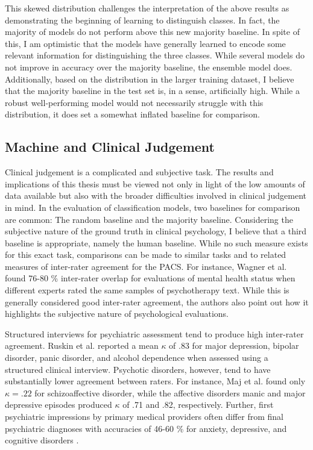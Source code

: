 \documentclass[12pt]{report}
\begin{document}
This skewed distribution challenges the interpretation of the above results as demonstrating the beginning of learning to distinguish classes.
In fact, the majority of models do not perform above this new majority baseline.
In spite of this, I am optimistic that the models have generally learned to encode some relevant information for distinguishing the three classes.
While several models do not improve in accuracy over the majority baseline, the ensemble model does.
Additionally, based on the distribution in the larger training dataset, I believe that the majority baseline in the test set is, in a sense, artificially high.
While a robust well-performing model would not necessarily struggle with this distribution, it does set a somewhat inflated baseline for comparison.

\subsection{Machine and Clinical Judgement}
Clinical judgement is a complicated and subjective task.
The results and implications of this thesis must be viewed not only in light of the low amounts of data available but also with the broader difficulties involved in clinical judgement in mind.
In the evaluation of classification models, two baselines for comparison are common: The random baseline and the majority baseline.
Considering the subjective nature of the ground truth in clinical psychology, I believe that a third baseline is appropriate, namely the human baseline.
While no such measure exists for this exact task, comparisons can be made to similar tasks and to related measures of inter-rater agreement for the PACS.
For instance, Wagner et al. \citeyear{Wagner2023} found 76-80 \% inter-rater overlap for evaluations of mental health status when different experts rated the same samples of psychotherapy text.
While this is generally considered good inter-rater agreement, the authors also point out how it highlights the subjective nature of psychological evaluations.

Structured interviews for psychiatric assessment tend to produce high inter-rater agreement.
Ruskin et al. \citeyear{Ruskin1998} reported a mean $\kappa$ of .83 for major depression, bipolar disorder, panic disorder, and alcohol dependence when assessed using a structured clinical interview.
Psychotic disorders, however, tend to have substantially lower agreement between raters.
For instance, Maj et al. \citeyear{Maj2000} found only $\kappa = .22$ for schizoaffective disorder, while the affective disorders manic and major depressive episodes produced $\kappa$ of .71 and .82, respectively.
Further, first psychiatric impressions by primary medical providers often differ from final psychiatric diagnoses with accuracies of 46-60 \% for anxiety, depressive, and cognitive disorders \cite{Al-Huthail2008}.
\end{document}
